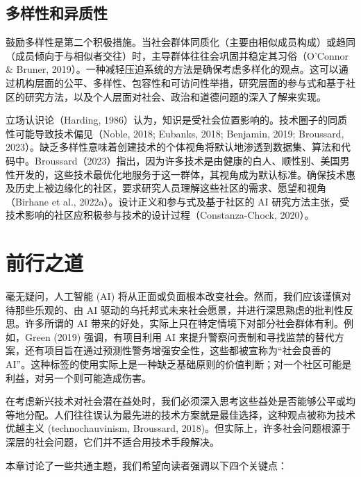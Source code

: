 \documentclass[lang=cn,newtx,10pt,scheme=chinese]{elegantbook}
\begin{document}
\subsection{多样性和异质性}
鼓励多样性是第二个积极措施。当社会群体同质化（主要由相似成员构成）或趋同（成员倾向于与相似者交往）时，主导群体往往会巩固并稳定其习俗（O’Connor \& Bruner, 2019）。一种减轻压迫系统的方法是确保考虑多样化的观点。这可以通过机构层面的公平、多样性、包容性和可访问性举措，研究层面的参与式和基于社区的研究方法，以及个人层面对社会、政治和道德问题的深入了解来实现。

立场认识论（Harding, 1986）认为，知识是受社会位置影响的。技术圈子的同质性可能导致技术偏见（Noble, 2018; Eubanks, 2018; Benjamin, 2019; Broussard, 2023）。缺乏多样性意味着创建技术的个体视角将默认地渗透到数据集、算法和代码中。Broussard（2023）指出，因为许多技术是由健康的白人、顺性别、美国男性开发的，这些技术最优化地服务于这一群体，其视角成为默认标准。确保技术惠及历史上被边缘化的社区，要求研究人员理解这些社区的需求、愿望和视角（Birhane et al., 2022a）。设计正义和参与式及基于社区的 AI 研究方法主张，受技术影响的社区应积极参与技术的设计过程（Constanza-Chock, 2020）。

\section{前行之道}
毫无疑问，人工智能 (AI) 将从正面或负面根本改变社会。然而，我们应该谨慎对待那些乐观的、由 AI 驱动的乌托邦式未来社会愿景，并进行深思熟虑的批判性反思。许多所谓的 AI 带来的好处，实际上只在特定情境下对部分社会群体有利。例如，Green (2019) 强调，有项目利用 AI 来提升警察问责制和寻找监禁的替代方案，还有项目旨在通过预测性警务增强安全性，这些都被宣称为“社会良善的 AI”。这种标签的使用实际上是一种缺乏基础原则的价值判断；对一个社区可能是利益，对另一个则可能造成伤害。

在考虑新兴技术对社会潜在益处时，我们必须深入思考这些益处是否能够公平或均等地分配。人们往往误认为最先进的技术方案就是最佳选择，这种观点被称为技术优越主义 (technochauvinism, Broussard, 2018)。但实际上，许多社会问题根源于深层的社会问题，它们并不适合用技术手段解决。

本章讨论了一些共通主题，我们希望向读者强调以下四个关键点：
\end{document}
